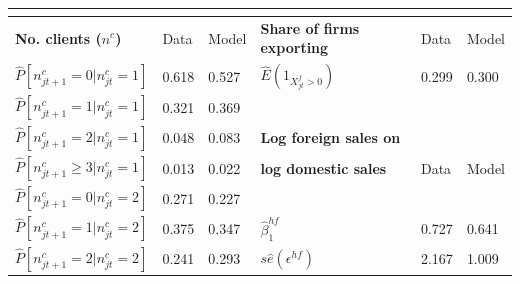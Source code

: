 \documentclass[12pt,titlepage]{article}
\begin{document}
\bigskip

\begin{table}
    \centering
    {\small 
    \begin{tabular}{llllll}
        \multicolumn{6}{c}{} \\ \hline\hline
        \textbf{No. clients (}$n^{c}$\textbf{)}\footnotemark[0]                                       & {Data}                                         &
        {Model}                                        & \textbf{Share of firms exporting} &
        {Data}                                         & {Model} \\ \hline
        $\widehat{P}[n_{jt+1}^{c}=0|n_{jt}^{c}=1]$     & {0.618}                           &
        {0.527}                                        & $\widehat{E}(1_{X_{jt}^{f}>0})$   &
        {0.299}                                        & {0.300} \\
        $\widehat{P}[n_{jt+1}^{c}=1|n_{jt}^{c}=1]$     & {0.321}                           &
        {0.369}                                        &                                   & {}     & {}
        \\
        $\widehat{P}[n_{jt+1}^{c}=2|n_{jt}^{c}=1]$     & {0.048}                           &
        {0.083}                                        & \textbf{Log foreign sales on}     &
        {}                                             & {} \\
        $\widehat{P}[n_{jt+1}^{c}\geq 3|n_{jt}^{c}=1]$ & {0.013}                           &
        {0.022}                                        & \textbf{log domestic sales}       & {
        Data}                                          & {Model} \\ \cline{4-6}
        $\widehat{P}[n_{jt+1}^{c}=0|n_{jt}^{c}=2]$     & {0.271}                           &
        {0.227}                                        &                                   & {}     & {}
        \\
        $\widehat{P}[n_{jt+1}^{c}=1|n_{jt}^{c}=2]$     & {0.375}                           &
        {0.347}                                        & $\widehat{\beta }_{1}^{hf}$       & {
        0.727}                                         & {0.641} \\
        $\widehat{P}[n_{jt+1}^{c}=2|n_{jt}^{c}=2]$     & {0.241}                           &
        {0.293}                                        & $s\widehat{e}(\epsilon ^{hf})$    &
        {2.167}                                        & {1.009} \\

\end{tabular}}
\end{table}
\end{document}

